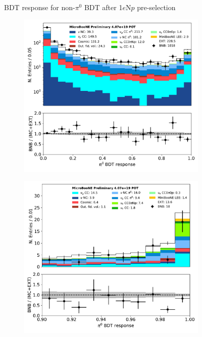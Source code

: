 \documentclass[a4paper]{article}
\begin{document}
\begin{figure}[H]
\begin{center}
\begin{subfigure}[b]{0.45\textwidth}
    \caption{\label{fig:1eNp:bdt:nonpi0:zoom}}
    \end{subfigure}
\caption{\label{ffig:1eNp:bdt:nonpi0}BDT response for non-$\pi^0$ BDT after 1$e$N$p$ pre-selection}
\end{center}
\end{figure}


\begin{figure}[H] 
\begin{center}
    \begin{subfigure}[b]{0.45\textwidth}
    \centering
    \includegraphics[width=1.00\textwidth]{1eNp/pi0_score_01162020_RUN1.pdf}
    \caption{\label{fig:1eNp:bdt:pi0:all}}
    \end{subfigure}
    \begin{subfigure}[b]{0.45\textwidth}
    \centering
    \includegraphics[width=1.00\textwidth]{1eNp/pi0_score_zoom_01162020_RUN1.pdf}

\end{subfigure}
\end{center}
\end{figure}
\end{document}
